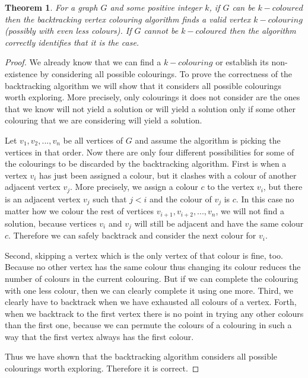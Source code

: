 \documentclass{report}
\theoremstyle{plain}
\newtheorem{theorem}{Theorem}
\theoremstyle{definition}
\theoremstyle{remark}
\numberwithin{definition}{chapter}
\numberwithin{example}{chapter}
\numberwithin{figure}{chapter}
\numberwithin{theorem}{chapter}
\numberwithin{lemma}{chapter}
\begin{document}
\begin{theorem}
For a graph $G$ and some positive integer $k$, if $G$ can be $k-coloured$ then the backtracking vertex colouring algorithm finds a valid vertex $k-colouring$ (possibly with even less colours). If $G$ cannot be $k-coloured$ then the algorithm correctly identifies that it is the case.
\end{theorem}

\begin{proof}
We already know that we can find a $k-colouring$ or establish its non-existence by considering all possible colourings. To prove the correctness of the backtracking algorithm we will show that it considers all possible colourings worth exploring. More precisely, only colourings it does not consider are the ones that we know will not yield a solution or will yield a solution only if some other colouring that we are considering will yield a solution. 

Let $v_1,v_2,...,v_n$ be all vertices of $G$ and assume the algorithm is picking the vertices in that order.
Now there are only four different possibilities for some of the colourings to be discarded by the backtracking algorithm. First is when a vertex $v_i$ has just been assigned a colour, but it clashes with a colour of another adjacent vertex $v_j$. More precisely, we assign a colour $c$ to the vertex $v_i$, but there is an adjacent vertex $v_j$ such that $j<i$ and the colour of $v_j$ is $c$. In this case no matter how we colour the rest of vertices $v_{i+1},v_{i+2},...,v_n$, we will not find a solution, because vertices $v_i$ and $v_j$ will still be adjacent and have the same colour $c$. Therefore we can safely backtrack and consider the next colour for $v_i$.

Second, skipping a vertex which is the only vertex of that colour is fine, too. Because no other vertex has the same colour thus changing its colour reduces the number of colours in the current colouring. But if we can complete the colouring with one less colour, then we can clearly complete it using one more. Third, we clearly have to backtrack when we have exhausted all colours of a vertex. Forth, when we backtrack to the first vertex there is no point in trying any other colours than the first one, because we can permute the colours of a colouring in such a way that the first vertex always has the first colour.

Thus we have shown that the backtracking algorithm considers all possible colourings worth exploring. Therefore it is correct.
\end{proof}
\end{document}
